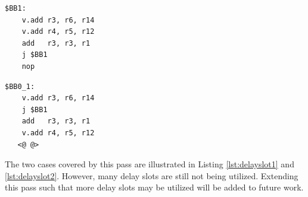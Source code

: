 \label{lst:delayslot2}
\begin{center}
\hspace{2px}\begin{minipage}{.475\textwidth}
\begin{lstlisting}[frame=tlrb]
$BB1:
    v.add r3, r6, r14
    v.add r4, r5, r12
    add   r3, r3, r1
    j $BB1
    nop
\end{lstlisting}
\end{minipage}\hfill
\begin{minipage}{.475\textwidth}
\begin{lstlisting}[frame=tlrb]
$BB0_1:
    v.add r3, r6, r14
    j $BB1
    add   r3, r3, r1
    v.add r4, r5, r12
   <@ @>
\end{lstlisting}
\end{minipage}
\end{center}

The two cases covered by this pass are illustrated in Listing \ref{lst:delayslot1} and \ref{lst:delayslot2}. However, many delay slots are still not being utilized. Extending this pass such that more delay slots may be utilized will be added to future work.


